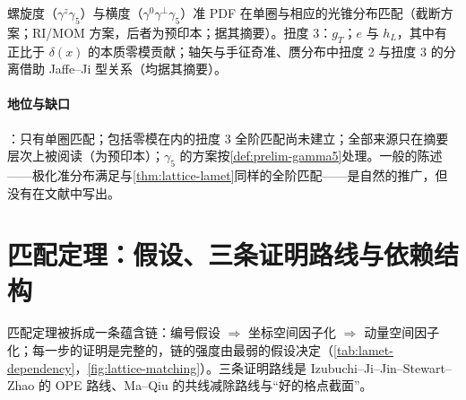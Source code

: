 \begin{proposition}\label{prop:lamet-polarized}
螺旋度（$\gamma^z\gamma_5$）与横度（$\gamma^0\gamma^\perp\gamma_5$）准 PDF 在单圈与相应的光锥分布匹配（截断方案\cite{XiongEtAl2014}；RI/MOM 方案\cite{Lin:2018pvv,Liu:2018hxv}，后者为预印本；据其摘要）。扭度 3：$g_T$\cite{Bhattacharya:2020xlt}；$e$ 与 $h_L$，其中有正比于 $\delta(x)$ 的本质零模贡献\cite{Bhattacharya:2020jfj}；轴矢\cite{Braun:2021aon}与手征奇\cite{Braun:2021gvv}准、赝分布中扭度 2 与扭度 3 的分离借助 Jaffe--Ji 型关系（均据其摘要）。
\end{proposition}

\paragraph{地位与缺口}
\tagP：只有单圈匹配；包括零模在内的扭度 3 全阶匹配尚未建立；全部来源只在摘要层次上被阅读（\cite{Liu:2018hxv}为预印本）；$\gamma_5$ 的方案按\cref{def:prelim-gamma5}处理。一般的陈述——极化准分布满足与\cref{thm:lattice-lamet}同样的全阶匹配——是自然的推广，但没有在文献中写出。

\section{匹配定理：假设、三条证明路线与依赖结构}\label{sec:lattice-matching}

匹配定理被拆成一条蕴含链：编号假设 $\Rightarrow$ 坐标空间因子化 $\Rightarrow$ 动量空间因子化；每一步的证明是完整的，链的强度由最弱的假设决定（\cref{tab:lamet-dependency}，\cref{fig:lattice-matching}）。三条证明路线是 Izubuchi--Ji--Jin--Stewart--Zhao 的 OPE 路线\cite{IzubuchiEtAl2018}、Ma--Qiu 的共线减除路线\cite{Ma:2014jla}与“好的格点截面”\cite{MaQiu2018}。

